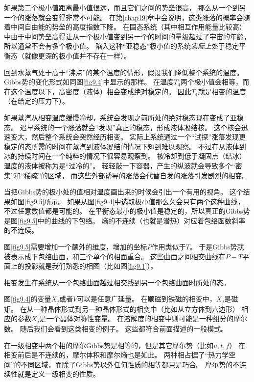 如果第二个极小值距离最小值很远，而且它们之间的势垒很高，
那么从一个到另一个的涨落就会变得非常不可能。
在第\ref{chap19}章中会说明，这类涨落的概率会随着中间自由能的势垒的高度指数下降。
在固态系统（其中相互作用能量比较高）中由于中间势垒高得让从一个极小值变到另一个的时间的量级超过了宇宙的年龄，所以通常不会有多个极小值。
陷入这种“亚稳态”极小值的系统{\it 实际上}处于稳定平衡态（就像更深的极小值并不存在一样）。

回到水蒸气处于高于“沸点”的某个温度的情形，假设我们降低整个系统的温度。
Gibbs势的变化形式如同图\ref{fig9.4}中显示的那样。
在温度$T_4$两个极小值会相等，而在这个温度以下，高密度（液体）相会变成绝对稳定的。
因此$T_4$就是相变的温度（在给定的压力下）。

如果蒸汽从相变温度缓慢冷却，系统会发现之前所处的绝对稳态现在变成了亚稳态。
迟早系统的一个涨落就会“发现”真正的稳态，形成液体凝结核。
这个核会迅速变大，然后整个系统会突然经历相变。
实际上系统通过一个“试探”涨落发现更稳定的态所需的时间在蒸汽到液体凝结的情况下短到难以观察。
不过在从液体到冰的持续时间在一个纯粹的情况下很容易观察到。
被冷却到低于凝固点（结冰）温度的液体被称为是“过冷的”。
轻轻敲一下容器，产生的纵波就会导致多个“密集”和“稀疏”的区域，
而这些外部诱导的涨落会代替自发的涨落引发剧烈的相变。

当把Gibbs势的极小处的值相对温度画出来的时候会引出一个有用的视角。
这个结果如图\ref{fig9.5}所示。
如果从图\ref{fig9.4}中选取极小值那么久会只有两个这种曲线，
不过任意数值都是可能的。
在平衡态最小的极小值是稳定的，所以真正的Gibbs势是图\ref{fig9.5}中的曲线的下包络。
熵的不连续（也就是潜热）对应着包络函数斜率的不连续。

图\ref{fig9.5}需要增加一个额外的维度，增加的坐标$P$作用类似于$T$。
于是Gibbs势就被表示成下包络曲面，和三个单个的相面重合。
这些曲面之间相交曲线在$P-T$平面上的投影就是我们熟悉的相图（比如图\ref{fig9.1}）。

相变发生在系统从一个包络曲面越过相交线到另一个包络曲面时所处的态。

图\ref{fig9.4}的变量$X_j$或者$V$可以是任意广延量。
在顺磁到铁磁的相变中，$X_j$是磁矩。
在从一种晶体形式到另一种晶体形式的相变中（比如从立方体到六边形）
相应的参数$X_j$是一个晶体对称性变量。
在溶解度的相变中则可能是一种组分的摩尔数。
随后我们会看到这类相变的例子。
这些都符合前面描述的一般模式。

在一级相变中两个相的摩尔Gibbs势是相等的，但是其它摩尔势（比如$u,t,f$）
在相变前后是不连续的，摩尔体积和摩尔熵也是如此。
两种相占据了“热力学空间”的不同区域，而除了Gibbs势以外任何性质的相等都只是巧合。
摩尔势的不连续性就是定义一级相变的性质。

